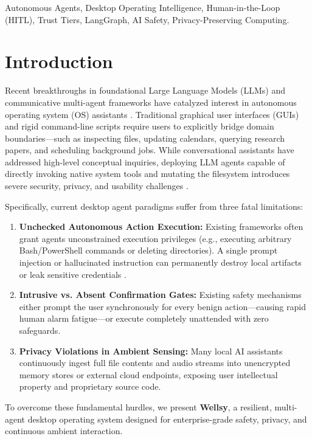 \documentclass[conference]{IEEEtran}
\begin{document}
\begin{IEEEkeywords}
Autonomous Agents, Desktop Operating Intelligence, Human-in-the-Loop (HITL), Trust Tiers, LangGraph, AI Safety, Privacy-Preserving Computing.
\end{IEEEkeywords}

\section{Introduction}
Recent breakthroughs in foundational Large Language Models (LLMs) and communicative multi-agent frameworks \cite{vaswani2017attention, wu2023autogen, hong2023metagpt} have catalyzed interest in autonomous operating system (OS) assistants \cite{xie2024osworld, yang2023appagent}. Traditional graphical user interfaces (GUIs) and rigid command-line scripts require users to explicitly bridge domain boundaries---such as inspecting files, updating calendars, querying research papers, and scheduling background jobs. While conversational assistants have addressed high-level conceptual inquiries, deploying LLM agents capable of directly invoking native system tools and mutating the filesystem introduces severe security, privacy, and usability challenges \cite{greshake2023not, amodei2016concrete}.

Specifically, current desktop agent paradigms suffer from three fatal limitations:
\begin{enumerate}
    \item \textbf{Unchecked Autonomous Action Execution:} Existing frameworks often grant agents unconstrained execution privileges (e.g., executing arbitrary Bash/PowerShell commands or deleting directories). A single prompt injection or hallucinated instruction can permanently destroy local artifacts or leak sensitive credentials \cite{carlini2021extracting}.
    \item \textbf{Intrusive vs. Absent Confirmation Gates:} Existing safety mechanisms either prompt the user synchronously for every benign action---causing rapid human alarm fatigue---or execute completely unattended with zero safeguards.
    \item \textbf{Privacy Violations in Ambient Sensing:} Many local AI assistants continuously ingest full file contents and audio streams into unencrypted memory stores or external cloud endpoints, exposing user intellectual property and proprietary source code.
\end{enumerate}

To overcome these fundamental hurdles, we present \textbf{Wellsy}, a resilient, multi-agent desktop operating system designed for enterprise-grade safety, privacy, and continuous ambient interaction. 
\end{document}
